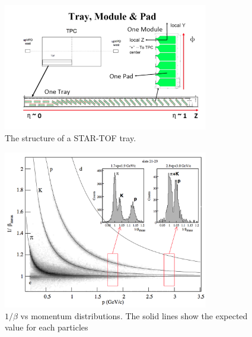 \begin{figure}
\begin{centering}
\includegraphics[width=0.8\textwidth]{fig/2.Detector/TOF/TrayModuleCell}
\par\end{centering}

\protect\caption{The structure of a STAR-TOF tray.}


\label{fig:TOFTray}
\end{figure}


\begin{figure}
\begin{centering}
\includegraphics[width=0.8\textwidth]{fig/2.Detector/TOF/1overBeta_TOF}
\par\end{centering}

\protect\caption{$1/\beta$ vs momentum distributions. The solid lines show the expected
value for each particles}


\label{fig:1/beta_TOF}
\end{figure}



